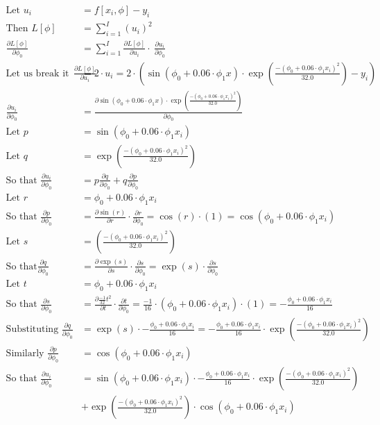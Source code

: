 \documentclass{article}
\begin{document}
\begin{align*}
\text{Let } u_i &= f[x_i, \phi]-y_i \\
\text{Then } L [\phi] &= \sum_{i=1}^{I} (u_i)^2 \\
\frac{\partial{L[\phi]}}{\partial{\phi_0}} &= \sum_{i=1}^{I}  \frac{\partial{L[\phi]}}{\partial{u_i}} \cdot \
 \frac{\partial{u_i}}{\partial{\phi_0}}
 \\
 \text{Let us break it down } \frac{\partial{L[\phi]}}{\partial{u_i}} &= 2 \cdot u_i = 2 \cdot \left( \sin(\phi_0 + 0.06 \cdot \phi_1x) \cdot \exp  \left( \frac{-(\phi_0 + 0.06 \cdot \phi_1x_i)^2}{32.0} \right) - y_i \right)
 \\
 \frac{\partial{u_i}}{\partial{\phi_0}} &= \frac{\partial{\sin(\phi_0 + 0.06 \cdot \phi_1x) \cdot \exp  \left( \frac{-(\phi_0 + 0.06 \cdot \phi_1x_i)^2}{32.0} \right)}}{\partial{\phi_0}} \\
 \text{Let } p &= \sin(\phi_0 + 0.06 \cdot \phi_1x_i) \\
 \text{Let } q &= \exp  \left( \frac{-(\phi_0 + 0.06 \cdot \phi_1x_i)^2}{32.0} \right) \\
 \text{So that } \frac{\partial{u_i}}{\partial{\phi_0}} &= p\frac{\partial{q}}{\partial{\phi_0}} + q \frac{\partial{p}}{\partial{\phi_0}}
 \\
 \text{Let } r &= \phi_0 + 0.06 \cdot \phi_1 x_i
 \\
 \text{So that } \frac{\partial{p}}{\partial{\phi_0}} &= \frac{\partial{\sin(r)}}{\partial{r}} \cdot \frac{\partial{r}}{\partial{\phi_0}} = \cos (r) \cdot (1) = \cos(\phi_0 + 0.06\cdot \phi_1 x_i)
 \\
 \text{Let } s &= \left( \frac{-(\phi_0 + 0.06 \cdot \phi_1x_i)^2}{32.0} \right)
 \\
 \text{So that} \frac{\partial{q}}{\partial{\phi_0}} &= \frac{\partial{\exp(s)}}{\partial{s}} \cdot \frac{\partial{s}}{\partial{\phi_0}} = \exp(s) \cdot \frac{\partial{s}}{\partial{\phi_0}}
 \\
 \text{Let }t &= \phi_0 + 0.06 \cdot \phi_1x_i
 \\
 \text{So that } \frac{\partial{s}}{\partial{\phi_0}} &= \frac{\partial{\frac{-1}{32}}t^2}{\partial{t}} \cdot \frac{\partial{t}}{\partial{\phi_0}} = \frac{-1}{16} \cdot ( \phi_0 + 0.06 \cdot \phi_1x_i ) \cdot (1) = -\frac{\phi_0 + 0.06 \cdot \phi_1x_i}{16}
 \\
 \text{Substituting } \frac{\partial{q}}{\partial{\phi_0}} &= \exp(s) \cdot  -\frac{\phi_0 + 0.06 \cdot \phi_1x_i}{16} = -\frac{\phi_0 + 0.06 \cdot \phi_1x_i}{16} \cdot \exp \left( \frac{-(\phi_0 + 0.06 \cdot \phi_1x_i)^2}{32.0} \right)
 \\
 \text{Similarly } \frac{\partial{p}}{\partial{\phi_0}} &= \cos(\phi_0 + 0.06\cdot \phi_1 x_i)
 \\
 \text{So that } \frac{\partial{u_i}}{\partial{\phi_0}} &= \sin(\phi_0 + 0.06 \cdot \phi_1x_i) \cdot -\frac{\phi_0 + 0.06 \cdot \phi_1x_i}{16} \cdot \exp \left( \frac{-(\phi_0 + 0.06 \cdot \phi_1x_i)^2}{32.0} \right) \\
 &+ \exp  \left( \frac{-(\phi_0 + 0.06 \cdot \phi_1x_i)^2}{32.0} \right) \cdot \cos(\phi_0 + 0.06\cdot \phi_1 x_i)
\end{align*}
\end{document}
